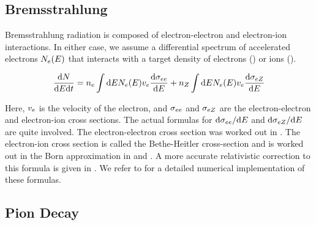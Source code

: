 \subsection{Bremsstrahlung}

Bremsstrahlung radiation is composed of electron-electron and electron-ion
interactions.  In either case, we assume a differential spectrum of
accelerated electrons $N_e(E)$ that
interacts with a target density of electrons (\ElectronDensity) or ions
(\IonDensity).

\begin{equation}
  \frac{\text{d} N}{\text{d}E\text{d}t} =
  n_e \int \text{d}E
  N_e(E) v_e
  \frac{\text{d}\sigma_{ee}}{\text{d}E} +
  n_Z \int \text{d}E
  N_e(E) v_e
  \frac{\text{d}\sigma_{eZ}}{\text{d}E}
\end{equation}

Here, $v_e$ is the velocity of the
electron, and $\sigma_{ee}$ and
$\sigma_{eZ}$ are the electron-electron
and electron-ion cross sections.  The actual formulas for
$\text{d}\sigma_{ee}/\text{d}E$ and
$\text{d}\sigma_{eZ}/\text{d}E$
are quite involved.  The electron-electron cross section was worked out
in \cite{haug_1975a_bremsstrahlung-production}.  The electron-ion cross
section is called the Bethe-Heitler cross-section and is worked
out in the Born approximation in \cite{heitler_1954a_quantum-theory}
and \cite{koch_1959a_bremsstrahlung-cross-section}.  A more
accurate relativistic correction to this formula is given in
\cite{haug_1997a_nonrelativistic-bremsstrahlung}.  We refer to
\cite{houck_2006a_models-nonthermal} for a detailed numerical
implementation of these formulas.

\subsection{Pion Decay}

